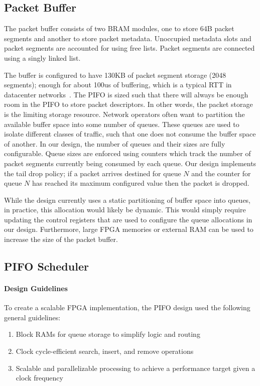 \subsection{Packet Buffer}\label{sec:pkt-buf}
The packet buffer consists of two BRAM modules, one to store 64B packet segments and another to store packet metadata. Unoccupied metadata slots and packet segments are accounted for using free lists. Packet segments are connected using a singly linked list.

The buffer is configured to have 130KB of packet segment storage (2048 segments); enough for about 100us of buffering, which is a typical RTT in datacenter networks~\cite{timely}. The PIFO is sized such that there will always be enough room in the PIFO to store packet descriptors.  In other words, the packet storage is the limiting storage resource. Network operators often want to partition the available buffer space into some number of queues. These queues are used to isolate different classes of traffic, such that one does not consume the buffer space of another. In our design, the number of queues and their sizes are fully configurable. Queue sizes are enforced using counters which track the number of packet segments currently being consumed by each queue. Our design implements the tail drop policy; if a packet arrives destined for queue $N$ and the counter for queue $N$ has reached its maximum configured value then the packet is dropped.

While the design currently uses a static partitioning of buffer space into queues, in practice, this allocation would likely be dynamic. This would simply require updating the control registers that are used to configure the queue allocations in our design. Furthermore, large FPGA memories or external RAM can be used to increase the size of the packet buffer.

\subsection{PIFO Scheduler}

\paragraph{Design Guidelines}
To create a scalable FPGA implementation, the PIFO design used the following general guidelines:

\begin{enumerate}
    \item Block RAMs for queue storage to simplify logic and routing
    \item Clock cycle-efficient search, insert, and remove operations 
    \item Scalable and parallelizable processing to achieve a performance target given a clock frequency
\end{enumerate}


